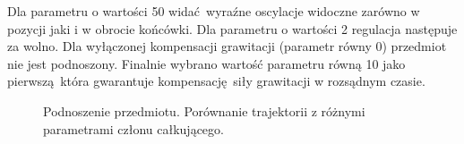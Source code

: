 Dla parametru o wartości 50 widać wyraźne oscylacje widoczne zarówno w pozycji jaki i w obrocie końcówki. Dla parametru o wartości 2 regulacja następuje za wolno. Dla wyłączonej kompensacji grawitacji (parametr równy 0) przedmiot nie jest podnoszony. Finalnie wybrano wartość parametru równą 10 jako pierwszą która gwarantuje kompensację siły grawitacji w rozsądnym czasie. 

\begin{figure}[H]
	\centering
	\hfill

	\caption{Podnoszenie przedmiotu. Porównanie trajektorii z różnymi parametrami członu całkującego.}
	\label{fig:param_a}
	
\end{figure}


